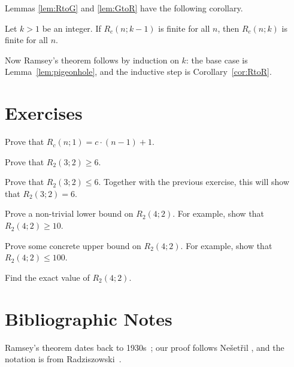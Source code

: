 Lemmas \ref{lem:RtoG} and \ref{lem:GtoR} have the following corollary.

\begin{corollary}\label{cor:RtoR}
    Let $k > 1$ be an integer.
    If $R_c(n;k-1)$ is finite for all $n$, then $R_c(n;k)$ is finite for all $n$.
\end{corollary}

Now Ramsey's theorem follows by induction on $k$: the base case is Lemma~\ref{lem:pigeonhole}, and the inductive step is Corollary~\ref{cor:RtoR}.


\section{Exercises}

\begin{ex}
    Prove that $R_c(n;1) = c\cdot(n-1)+1$.
    
\end{ex}

\begin{ex}
    Prove that $R_2(3;2) \ge 6$.

\end{ex}

\begin{ex}
    Prove that $R_2(3;2) \le 6$. Together with the previous exercise, this will show that $R_2(3;2) = 6$.
\end{ex}

\begin{ex}
    Prove a non-trivial lower bound on $R_2(4;2)$. For example, show that $R_2(4;2) \ge 10$.
\end{ex}

\begin{ex}
    Prove some concrete upper bound on $R_2(4;2)$. For example, show that $R_2(4;2) \le 100$.
\end{ex}

\begin{exs}
    Find the exact value of $R_2(4;2)$.
\end{exs}


\section{Bibliographic Notes}

Ramsey's theorem dates back to 1930s~\cite{ramsey30problem}; our proof follows Ne{\v s}et{\v r}il \cite{nesetril95ramsey}, and the notation is from Radziszowski~\cite{radziszowski11ramsey}.
